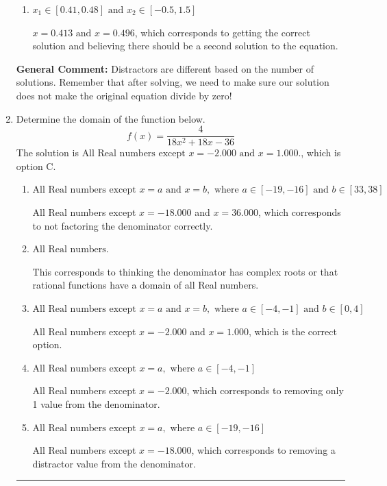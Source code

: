 \documentclass{extbook}[14pt]
\newcommand{\litem}[1]{\item #1

\rule{\textwidth}{0.4pt}}
\begin{document}
\begin{enumerate}
{\begin{enumerate}[label=\Alph*.]
This corresponds to thinking $x = 0.496$ leads to dividing by zero in the original equation, which it does not.
\item \( x_1 \in [0.41, 0.48] \text{ and } x_2 \in [-0.5,1.5] \)

$x = 0.413 \text{ and } x = 0.496$, which corresponds to getting the correct solution and believing there should be a second solution to the equation.
\end{enumerate}

\textbf{General Comment:} Distractors are different based on the number of solutions. Remember that after solving, we need to make sure our solution does not make the original equation divide by zero!
}
\litem{
Determine the domain of the function below.
\[ f(x) = \frac{4}{18x^{2} +18 x -36} \]The solution is \( \text{All Real numbers except } x = -2.000 \text{ and } x = 1.000. \), which is option C.\begin{enumerate}[label=\Alph*.]
\item \( \text{All Real numbers except } x = a \text{ and } x = b, \text{ where } a \in [-19, -16] \text{ and } b \in [33, 38] \)

All Real numbers except $x = -18.000$ and $x = 36.000$, which corresponds to not factoring the denominator correctly.
\item \( \text{All Real numbers.} \)

This corresponds to thinking the denominator has complex roots or that rational functions have a domain of all Real numbers.
\item \( \text{All Real numbers except } x = a \text{ and } x = b, \text{ where } a \in [-4, -1] \text{ and } b \in [0, 4] \)

All Real numbers except $x = -2.000$ and $x = 1.000$, which is the correct option.
\item \( \text{All Real numbers except } x = a, \text{ where } a \in [-4, -1] \)

All Real numbers except $x = -2.000$, which corresponds to removing only 1 value from the denominator.
\item \( \text{All Real numbers except } x = a, \text{ where } a \in [-19, -16] \)

All Real numbers except $x = -18.000$, which corresponds to removing a distractor value from the denominator.
\end{enumerate}

}
\end{enumerate}
\end{document}

